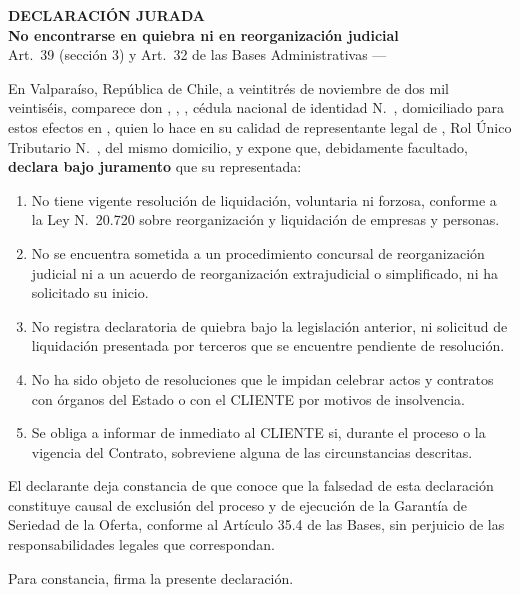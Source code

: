 \documentclass[11pt]{article}
\begin{document}
\begin{center}
  {\Large\bfseries DECLARACIÓN JURADA}\\[6pt]
  {\bfseries No encontrarse en quiebra ni en reorganización judicial}\\[4pt]
  {\small Art.~39\textdegree{} (sección 3) y Art.~32\textdegree{} de las Bases Administrativas --- \LFXlicitacion}
\end{center}

\noindent En Valparaíso, República de Chile, a veintitrés de noviembre de dos mil veintiséis, comparece don \textbf{\LFXrepresentante}, \SIMnacionalidad, \SIMprofesion, cédula nacional de identidad N.\textdegree~\SIMrunrepresentante, domiciliado para estos efectos en \LFXdomicilio, quien lo hace en su calidad de representante legal de \textbf{\LFXempresa}, Rol Único Tributario N.\textdegree~\LFXrut, del mismo domicilio, y expone que, debidamente facultado, \textbf{declara bajo juramento} que su representada:

\begin{enumerate}[label=\arabic*.,leftmargin=2em,itemsep=2pt]
  \item No tiene vigente resolución de liquidación, voluntaria ni forzosa, conforme a la Ley N.\textdegree~20.720 sobre reorganización y liquidación de empresas y personas.
  \item No se encuentra sometida a un procedimiento concursal de reorganización judicial ni a un acuerdo de reorganización extrajudicial o simplificado, ni ha solicitado su inicio.
  \item No registra declaratoria de quiebra bajo la legislación anterior, ni solicitud de liquidación presentada por terceros que se encuentre pendiente de resolución.
  \item No ha sido objeto de resoluciones que le impidan celebrar actos y contratos con órganos del Estado o con el CLIENTE por motivos de insolvencia.
  \item Se obliga a informar de inmediato al CLIENTE si, durante el proceso o la vigencia del Contrato, sobreviene alguna de las circunstancias descritas.
\end{enumerate}

\noindent El declarante deja constancia de que conoce que la falsedad de esta declaración constituye causal de exclusión del proceso y de ejecución de la Garantía de Seriedad de la Oferta, conforme al Artículo 35.4 de las Bases, sin perjuicio de las responsabilidades legales que correspondan.

\noindent Para constancia, firma la presente declaración.
\end{document}
